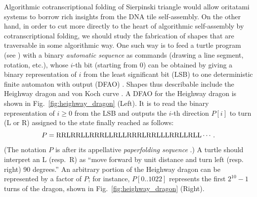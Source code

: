 Algorithmic cotranscriptional folding of Sierpinski triangle would allow oritatami systems to borrow rich insights from the DNA tile self-assembly. 
On the other hand, in order to cut more directly to the heart of algorithmic self-assembly by cotranscriptional folding, we should study the fabrication of shapes that are traversable in some algorithmic way. 
One such way is to feed a turtle program (see \cite{AbelsondiSessa1981}) with a binary \textit{automatic sequence} as commands (drawing a line segment, rotation, etc.), whose $i$-th bit (starting from 0) can be obtained by giving a binary representation of $i$ from the least significant bit (LSB) to one deterministic finite automaton with output (DFAO) \cite{AlloucheShallit2003}.
Shapes thus describable include the Heighway dragon \cite{AlloucheShallit2003} and von Koch curve \cite{MaHoldener2005}. 
A DFAO for the Heighway dragon is shown in Fig.~\ref{fig:heighway_dragon} (Left). 
It is to read the binary representation of $i \ge 0$ from the LSB and outputs the $i$-th direction $P[i]$ to turn (L or R) assigned to the state finally reached as follows: 
\[
P 	= {\rm RRLRRLLRRRLLRLLRRRLRRLLLRRLLRLL} \cdots.
\]
(The notation $P$ is after its appellative \textit{paperfolding sequence} \cite{AlloucheShallit2003}.) 
A turtle should interpret an L (resp.~R) as ``move forward by unit distance and turn left (resp. right) 90 degrees.''
An arbitrary portion of the Heighway dragon can be represented by a factor of $P$; for instance, $P[0 .. 1022]$ represents the first $2^{10}-1$ turns of the dragon, shown in Fig.~\ref{fig:heighway_dragon} (Right). 

